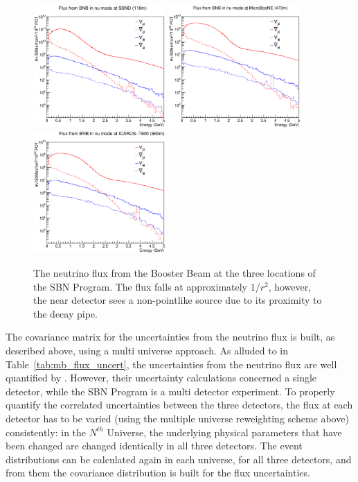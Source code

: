 \begin{figure}[htbp]
  \centering
  \includegraphics[width=0.45\textwidth]{sbn_figures/bnb_flux_nu_100m.eps}
  \includegraphics[width=0.45\textwidth]{sbn_figures/bnb_flux_nu_470m.eps}
  \includegraphics[width=0.45\textwidth]{sbn_figures/bnb_flux_nu_700m.eps}
  \caption[BNB Fluxes]{The neutrino flux from the Booster Beam at the three locations of the SBN Program.  The flux falls at approximately $1/r^2$, however, the near detector sees a non-pointlike source due to its proximity to the decay pipe.}
  \label{fig:sbn_flux}
\end{figure}

The covariance matrix for the uncertainties from the neutrino flux is built, as described above, using a multi universe approach.  As alluded to in Table~\ref{tab:mb_flux_uncert}, the uncertainties from the neutrino flux are well quantified by \MB.  However, their uncertainty calculations concerned a single detector, while the SBN Program is a multi detector experiment.  To properly quantify the correlated uncertainties between the three detectors, the flux at each detector has to be varied (using the multiple universe reweighting scheme above) consistently: in the $N^{th}$ Universe, the underlying physical parameters that have been changed are changed identically in all three detectors.  The event distributions can be calculated again in each universe, for all three detectors, and from them the covariance distribution is built for the flux uncertainties.


